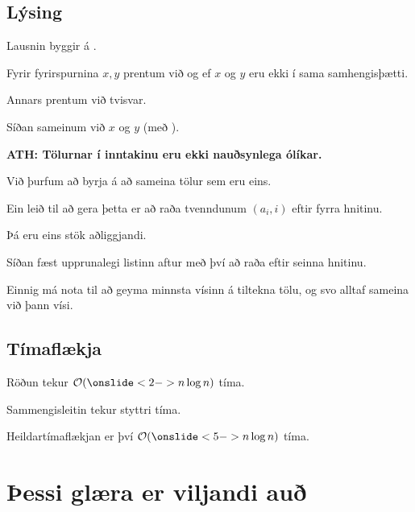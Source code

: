 \subsection{Lýsing}
{
	{
		\item<1-> Lausnin byggir á \onslide<2->{sammengisleit}.
		\item<3-> Fyrir fyrirspurnina $x, y$ prentum við  og  ef $x$ og $y$ eru ekki í sama samhengisþætti.
		\item<4-> Annars prentum við  tvisvar.
		\item<5-> Síðan sameinum við $x$ og $y$ (með ).
		\item<6-> \bf{ATH:} Tölurnar í inntakinu eru ekki nauðsynlega ólíkar.
		\item<7-> Við þurfum að byrja á að sameina tölur sem eru eins.
		\item<8-> Ein leið til að gera þetta er að raða tvenndunum $(a_i, i)$ eftir fyrra hnitinu.
		\item<9-> Þá eru eins stök aðliggjandi.
		\item<10-> Síðan fæst upprunalegi listinn aftur með því að raða eftir seinna hnitinu.
		\item<11-> Einnig má nota  til að geyma minnsta vísinn á tiltekna tölu, og svo alltaf sameina við þann vísi.
	}
}

\subsection{Tímaflækja}
{
	{
		\item<1-> Röðun tekur $\mathcal{O}(\onslide<2->{n \log n})$ tíma.
		\item<3-> Sammengisleitin tekur styttri tíma.
		\item<4-> Heildartímaflækjan er því $\mathcal{O}(\onslide<5->{n \log n})$ tíma.
	}
}

\section{Þessi glæra er viljandi auð}
{
}


